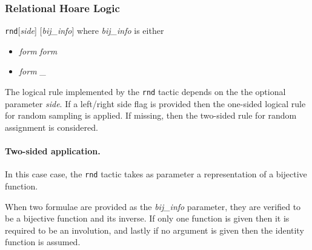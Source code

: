 
\subsubsection{Relational Hoare Logic}

\Syntax \verb+rnd+[\textit{side}] [\textit{bij\_info}]
where
\textit{bij\_info} is either
\begin{itemize}
  \item \textit{form} \textit{form}
  \item \textit{form} \_
\end{itemize}


\Description

The logical rule implemented by the \verb+rnd+ tactic depends on the
the optional parameter \textit{side}. If a left/right side flag is
provided then the one-sided logical rule for random sampling is
applied. If missing, then the two-sided rule for random assignment is
considered.
%

\paragraph*{Two-sided application.} 
In this case case, the \verb+rnd+ tactic takes as parameter a
representation of a bijective function. 

When two formulae are provided as the \textit{bij\_info} parameter,
they are verified to be a bijective function and its inverse. If only
one function is given then it is required to be an involution, and
lastly if no argument is given then the identity function is assumed.

